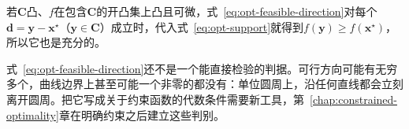 若$\bm{C}$凸、$f$在包含$\bm{C}$的开凸集上凸且可微，式~\eqref{eq:opt-feasible-direction}对每个$\bm{d}=\bm{y}-\bm{x}^\star$（$\bm{y}\in\bm{C}$）成立时，代入式~\eqref{eq:opt-support}就得到$f(\bm{y})\geq f(\bm{x}^\star)$，所以它也是充分的。

式~\eqref{eq:opt-feasible-direction}还不是一个能直接检验的判据。可行方向可能有无穷多个，曲线边界上甚至可能一个非零的都没有：单位圆周上，沿任何直线都会立刻离开圆周。把它写成关于约束函数的代数条件需要新工具，第~\ref{chap:constrained-optimality}章在明确约束之后建立这些判别。
